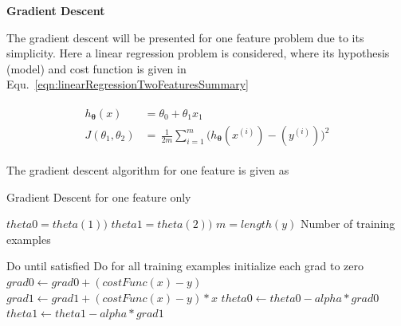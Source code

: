 \textbf{Gradient Descent}

The gradient descent will be presented for one feature problem due to its simplicity. Here a linear regression problem is considered, where its hypothesis (model) and cost function is given in Equ.~\ref{eqn:linearRegressionTwoFeaturesSummary}

\begin{align}
\label{eqn:linearRegressionTwoFeaturesSummary}
\begin{split}
h_{{\bm{\theta}}}(x) & = \theta_0 + \theta_1 x_1 
\\
J(\theta_1,\theta_2)
 & =\,
\frac{1}{2m} \sum\limits_{i=1}^{m} \Big(h_{\bm{\theta}}(x^{(i)}) - (y^{(i)})\Big)^2  
\end{split}
\end{align}

\clearpage

The gradient descent algorithm for one feature is given as 

 \begin{algorithm}
   \caption{Gradient Descent for one feature only}
    \begin{algorithmic}[1]
      

        \State $theta0 = theta(1))$  
        \State $theta1 = theta(2))$  
        \State $m = length(y)$ \Comment Number of training examples

         \Comment Do until satisfied
                     \Comment Do for all training examples
                         \State initialize each grad to zero
           	 	\State $grad0 \leftarrow grad0 + (costFunc(x) - y)$
		         \State $grad1 \leftarrow grad1 + (costFunc(x) - y) * x$
                    \EndFor
                    \State $theta0 \leftarrow theta0 - alpha * grad0$
                    \State $theta1 \leftarrow theta1 - alpha * grad1$
        \EndFor
       \EndFunction

\end{algorithmic}
\end{algorithm}
 
